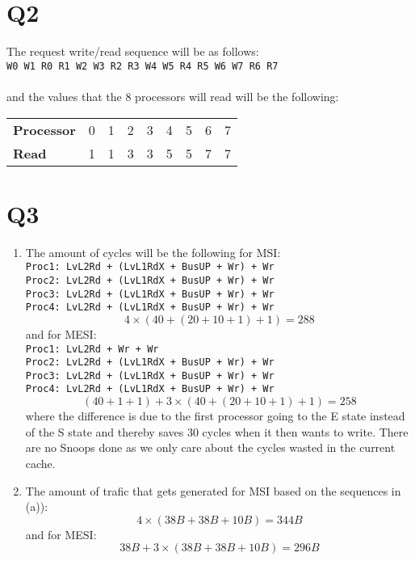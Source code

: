 \documentclass[a4paper]{article}
\begin{document}
\section*{Q2}
The request write/read sequence will be as follows: \\

\texttt{W0~W1~R0~R1~W2~W3~R2~R3~W4~W5~R4~R5~W6~W7~R6~R7} \\ \\
and the values that the 8 processors will read will be the following:\\

\begin{tabular}{ l | c c c c c c c c }

\textbf{Processor} & 0 & 1 & 2 & 3 & 4 & 5 & 6 & 7 \\
\textbf{Read}     & 1 & 1 & 3 & 3 & 5 & 5 & 7 & 7 \\

\end{tabular}

\section*{Q3}
\begin{enumerate}
\item %
\label{itm:3a}
The amount of cycles will be the following for MSI:
\texttt{
  \\Proc1: LvL2Rd + (LvL1RdX + BusUP + Wr) + Wr
  \\Proc2: LvL2Rd + (LvL1RdX + BusUP + Wr) + Wr
  \\Proc3: LvL2Rd + (LvL1RdX + BusUP + Wr) + Wr
  \\Proc4: LvL2Rd + (LvL1RdX + BusUP + Wr) + Wr 
}
\[4\times(40+(20+10+1)+1) = 288\]
and for MESI:
\texttt{
  \\Proc1: LvL2Rd + Wr + Wr
  \\Proc2: LvL2Rd + (LvL1RdX + BusUP + Wr) + Wr
  \\Proc3: LvL2Rd + (LvL1RdX + BusUP + Wr) + Wr
  \\Proc4: LvL2Rd + (LvL1RdX + BusUP + Wr) + Wr 
}
\[(40+1+1)+3\times(40+(20+10+1)+1) = 258\]
where the difference is due to the first processor going to the E state instead of the S state and thereby saves 30 cycles when it then wants to write. There are no Snoops done as we only care about the cycles wasted in the current cache.

\item %
The amount of trafic that gets generated for MSI based on the sequences in (a)):
\[4\times(38B+38B+10B) = 344B\]
and for MESI:
\[38B+3\times(38B+38B+10B) = 296B\]
\end{enumerate}
\end{document}
